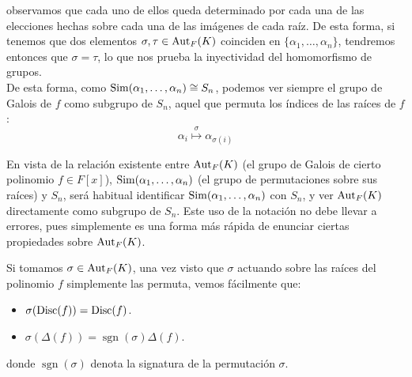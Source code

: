 \begin{figure}[H]
    \centering
\end{figure}
\noindent
observamos que cada uno de ellos queda determinado por cada una de las elecciones hechas sobre cada una de las imágenes de cada raíz. De esta forma, si tenemos que dos elementos $\sigma,\tau\in \operatorname{Aut}_F(K)$ coinciden en $\{\alpha_1, \ldots, \alpha_n\}$, tendremos entonces que $\sigma = \tau$, lo que nos prueba la inyectividad del homomorfismo de grupos.\\

\noindent
De esta forma, como $\operatorname{Sim}(\alpha_1, \ldots, \alpha_n)\cong S_n$, podemos ver siempre el grupo de Galois de $f$ como subgrupo de $S_n$, aquel que permuta los índices de las raíces de $f$:
\begin{equation*}
    \alpha_i \stackrel{\sigma}{\longmapsto} \alpha_{\sigma(i)}
\end{equation*}


\begin{notacion}
    En vista de la relación existente entre $\operatorname{Aut}_F(K)$ (el grupo de Galois de cierto polinomio $f\in F[x]$), $\operatorname{Sim}(\alpha_1, \ldots, \alpha_n)$ (el grupo de permutaciones sobre sus raíces) y $S_n$, será habitual identificar $\operatorname{Sim}(\alpha_1, \ldots, \alpha_n)$ con $S_n$, y ver $\operatorname{Aut}_F(K)$ directamente como subgrupo de $S_n$. Este uso de la notación no debe llevar a errores, pues simplemente es una forma más rápida de enunciar ciertas propiedades sobre $\operatorname{Aut}_F(K)$.
\end{notacion}

\begin{observacion}
    Si tomamos $\sigma\in \operatorname{Aut}_F(K)$, una vez visto que $\sigma$ actuando sobre las raíces del polinomio $f$ simplemente las permuta, vemos fácilmente que:
    \begin{itemize}
        \item $\sigma(\operatorname{Disc}(f)) = \operatorname{Disc}(f)$.
        \item $\sigma(\Delta(f)) = \operatorname{sgn}(\sigma)\Delta(f)$.
    \end{itemize}
    donde $\operatorname{sgn}(\sigma)$ denota la signatura de la permutación $\sigma$.
\end{observacion}~\\


